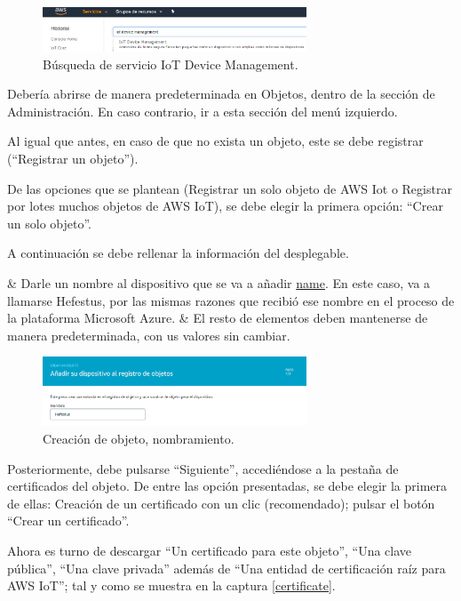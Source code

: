 \documentclass[english,runningheads,a4paper]{llncs}[2018/03/10]
\begin{document}
\begin{figure}[h!]
 \centering
 \includegraphics[width=0.7\textwidth]{./IoT/AWS/2-1_search.png}
 \caption{Búsqueda de servicio IoT Device Management.}
 \label{search2}
\end{figure}

Debería abrirse de manera predeterminada en Objetos, dentro de la sección de
Administración. En caso contrario, ir a esta sección del menú izquierdo.

Al igual que antes, en caso de que no exista un objeto, este se debe registrar
(``Registrar un objeto'').

De las opciones que se plantean (Registrar un solo objeto de AWS Iot o Registrar
por lotes muchos objetos de AWS IoT), se debe elegir la primera opción: ``Crear
un solo objeto''.

A continuación se debe rellenar la información del desplegable. 

\begin{easylist}[itemize]
  & Darle un nombre al dispositivo que se va a añadir \hyperref[name]{name}. En 
  este caso, va a llamarse Hefestus, por las mismas razones que recibió ese 
  nombre en el proceso de la plataforma Microsoft Azure.
  & El resto de elementos deben mantenerse de manera predeterminada, con us
  valores sin cambiar.
\end{easylist}

\begin{figure}[h!]
 \centering
 \includegraphics[width=0.7\textwidth]{./IoT/AWS/2-2_name.png}
 \caption{Creación de objeto, nombramiento.}
 \label{name}
\end{figure}

Posteriormente, debe pulsarse ``Siguiente'', accediéndose a la pestaña de
certificados del objeto. De entre las opción presentadas, se debe elegir la
primera de ellas: Creación de un certificado con un clic (recomendado); pulsar
el botón ``Crear un certificado''.

Ahora es turno de descargar ``Un certificado para este objeto'', ``Una clave
pública'', ``Una clave privada'' además de ``Una entidad de certificación raíz
para AWS IoT''; tal y como se muestra en la captura
\hyperref[certificate]{\ref{certificate}}.
\end{document}
